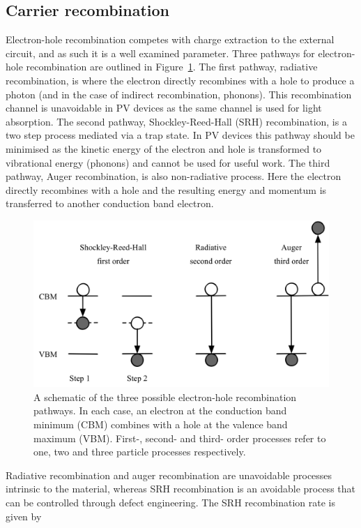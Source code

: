 \subsection{Carrier recombination} \label{recombination}
Electron-hole recombination competes with charge extraction to the external circuit, and as such it is a well examined parameter. Three pathways for electron-hole recombination are outlined in Figure\ \ref{recombination_processes}. The first pathway, radiative recombination, is where the electron directly recombines with a hole to produce a photon (and in the case of indirect recombination, phonons). This recombination channel is unavoidable in PV devices as the same channel is used for light absorption. The second pathway, Shockley-Reed-Hall (SRH) recombination, is a two step process mediated via a trap state. In PV devices this pathway should be minimised as the kinetic energy of the electron and hole is transformed to vibrational energy (phonons) and cannot be used for useful work. The third pathway, Auger recombination, is also non-radiative process. Here the electron directly recombines with a hole and the resulting energy and momentum is transferred to another conduction band electron.

\begin{figure}[h]
 \centering
   \includegraphics[width=0.65\columnwidth]{figures/ch1/recombination.png}
   \caption[Electron-hole recombination pathways]{A schematic of the three possible electron-hole recombination pathways. In each case, an electron at the conduction band minimum (CBM) combines with a hole at the valence band maximum (VBM). First-, second- and third- order processes refer to one, two and three particle processes respectively.}
   \label{recombination_processes}
 \end{figure}

Radiative recombination and auger recombination are unavoidable processes intrinsic to the material, whereas SRH recombination is an avoidable process that can be controlled through defect engineering. The SRH recombination rate is given by

